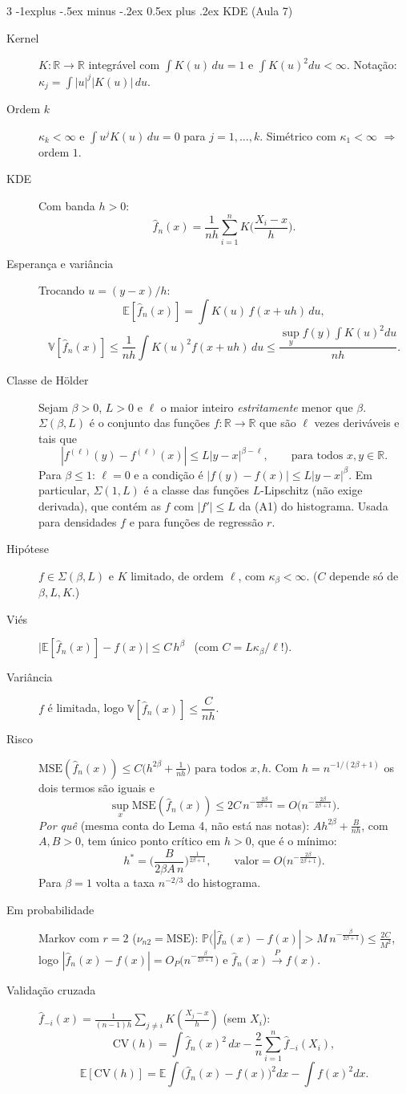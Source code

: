 \documentclass[10pt,landscape]{article}
\makeatletter
\newcommand{\E}{\mathbb{E}}
\newcommand{\V}{\mathbb{V}}
\renewcommand{\P}{\mathbb{P}}
\newcommand{\R}{\mathbb{R}}
\newcommand{\MSE}{\textrm{MSE}}
\newcommand{\CV}{\textrm{CV}}
\newcommand{\pto}{\xrightarrow{P}}
\renewcommand{\subsection}{\@startsection{subsection}{2}{0mm}%
                                {-1explus -.5ex minus -.2ex}%
                                {0.5ex plus .2ex}%
                                {\normalfont\footnotesize\bfseries}}
\makeatother
\begin{document}
\begin{multicols}{3}
\subsection{KDE (Aula 7)}
\begin{description}
  \item[Kernel] $K:\R\to\R$ integrável com $\int K(u)\,du=1$ e $\int K(u)^2du<\infty$. Notação: $\kappa_j=\int|u|^j|K(u)|\,du$.
  \item[Ordem $k$] $\kappa_k<\infty$ e $\int u^jK(u)\,du=0$ para $j=1,\dots,k$. Simétrico com $\kappa_1<\infty$ $\Rightarrow$ ordem $1$.
  \item[KDE] Com banda $h>0$:
  \[\hat f_n(x)=\frac1{nh}\sum_{i=1}^nK\Big(\frac{X_i-x}{h}\Big).\]
  \item[Esperança e variância] Trocando $u=(y-x)/h$:
  \[\E[\hat f_n(x)]=\int K(u)\,f(x+uh)\,du,\]
  \[\V[\hat f_n(x)]\le\frac1{nh}\int K(u)^2f(x+uh)\,du\le\frac{\sup_yf(y)\int K(u)^2du}{nh}.\]
  \item[Classe de Hölder] Sejam $\beta>0$, $L>0$ e $\ell$ o maior inteiro \emph{estritamente} menor que $\beta$. $\Sigma(\beta,L)$ é o conjunto das funções $f:\R\to\R$ que são $\ell$ vezes deriváveis e tais que
  \[|f^{(\ell)}(y)-f^{(\ell)}(x)|\le L|y-x|^{\beta-\ell},\qquad\text{para todos }x,y\in\R.\]
  Para $\beta\le1$: $\ell=0$ e a condição é $|f(y)-f(x)|\le L|y-x|^\beta$. Em particular, $\Sigma(1,L)$ é a classe das funções $L$-Lipschitz (não exige derivada), que contém as $f$ com $|f'|\le L$ da (A1) do histograma. Usada para densidades $f$ e para funções de regressão $r$.
  \item[Hipótese] $f\in\Sigma(\beta,L)$ e $K$ limitado, de ordem $\ell$, com $\kappa_\beta<\infty$. ($C$ depende só de $\beta,L,K$.)
  \item[Viés] $\big|\E[\hat f_n(x)]-f(x)\big|\le C\,h^{\beta}$ \ (com $C=L\kappa_\beta/\ell!$).
  \item[Variância] $f$ é limitada, logo $\V[\hat f_n(x)]\le\dfrac{C}{nh}$.
  \item[Risco] $\MSE(\hat f_n(x))\le C\big(h^{2\beta}+\frac1{nh}\big)$ para todos $x,h$. Com $h=n^{-1/(2\beta+1)}$ os dois termos são iguais e
  \[\sup_x\MSE(\hat f_n(x))\le2C\,n^{-\frac{2\beta}{2\beta+1}}=O\big(n^{-\frac{2\beta}{2\beta+1}}\big).\]
  \emph{Por quê} (mesma conta do Lema 4, não está nas notas): $Ah^{2\beta}+\frac{B}{nh}$, com $A,B>0$, tem único ponto crítico em $h>0$, que é o mínimo:
  \[h^*=\Big(\frac{B}{2\beta A\,n}\Big)^{\frac1{2\beta+1}},\qquad\text{valor}=O\big(n^{-\frac{2\beta}{2\beta+1}}\big).\]
  Para $\beta=1$ volta a taxa $n^{-2/3}$ do histograma.
  \item[Em probabilidade] Markov com $r=2$ ($\nu_{n2}=\MSE$): $\P\big(|\hat f_n(x)-f(x)|>M\,n^{-\frac{\beta}{2\beta+1}}\big)\le\frac{2C}{M^2}$, logo $|\hat f_n(x)-f(x)|=O_P\big(n^{-\frac{\beta}{2\beta+1}}\big)$ e $\hat f_n(x)\pto f(x)$.
  \item[Validação cruzada] $\hat f_{-i}(x)=\frac1{(n-1)h}\sum_{j\ne i}K(\frac{X_j-x}h)$ (sem $X_i$):
  \[\CV(h)=\int\hat f_n(x)^2\,dx-\frac2n\sum_{i=1}^n\hat f_{-i}(X_i),\]
  \[\E[\CV(h)]=\E\!\int\big(\hat f_n(x)-f(x)\big)^2dx-\int f(x)^2dx.\]
\end{description}


\end{multicols}
\end{document}
